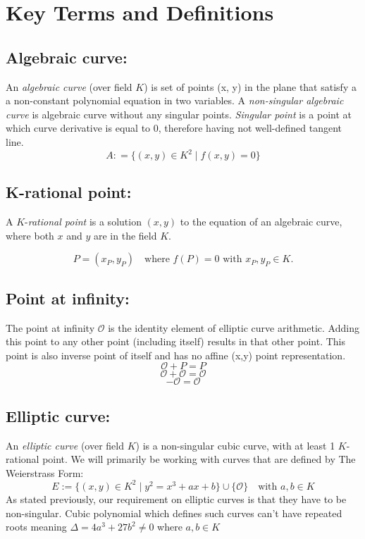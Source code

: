 \documentclass[bp,en]{FEIstyle}
\newcommand{\point}[1]{
#1 = (x_{#1}, y_{#1})
}
\begin{document}
\section*{Key Terms and Definitions}
\subsection*{Algebraic curve:}
An \textit{algebraic curve} (over field $K$) is set of points (x, y) in the plane that satisfy a a non-constant polynomial equation in two variables. A \textit{non-singular algebraic curve} is algebraic curve without any singular points. \textit{Singular point} is a point at which curve derivative is equal to 0, therefore having not well-defined tangent line.
\[
A: = \{ (x,y) \in K^2 \mid f(x, y) = 0\}  
\]
\subsection*{K-rational point:}
A \( K \)-\textit{rational point} is a solution \( (x, y) \) to the equation of an algebraic curve, where both \( x \) and \( y \) are in the field \( K \). 

\[
\point{P} \quad \text{where } f(P) = 0 \text{ with } x_{P}, y_{P} \in K.
\]

\subsection*{Point at infinity:}
The point at infinity $\mathcal{O}$ is the identity element of elliptic curve arithmetic. Adding this point to any other point (including itself) results in that other point. This point is also inverse point of itself and has no affine (x,y) point representation.
\[
\mathcal{O} + P = P 
\]
\[
\mathcal{O} + \mathcal{O} = \mathcal{O} 
\]
\[
-\mathcal{O}=\mathcal{O} 
\]
\subsection*{Elliptic curve:}
An \textit{elliptic curve} (over field $K$) is a non-singular cubic curve, with at least 1 $K$-rational point. We will primarily be working with curves that are defined by The Weierstrass Form:
\[
E := \{ (x,y) \in K^2 \mid y^2 = x^3 + ax + b \} \cup \{ \mathcal{O} 
\} \quad \text{with } a, b \in K
\]
As stated previously, our requirement on elliptic curves is that they have to be non-singular. Cubic polynomial which defines such curves can't have repeated roots meaning $\Delta=4a^3+27b^2\neq0$ where $a,b \in K$
\newpage
\end{document}
